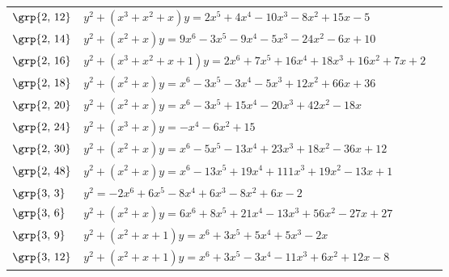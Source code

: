 \begin{longtable}{@{}>{\raggedright\arraybackslash}p{1.35cm}
 >{\raggedright\arraybackslash}p{}
 >{\raggedright\arraybackslash}p{1.25cm}@{}}
$\grp{2,\,12}$ & \href{https://www.lmfdb.org/Genus2Curve/Q/450/a/36450/1}{$y^2 + (x^{3}+x^{2}+x)y = 2x^{5}+4x^{4}-10x^{3}-8x^{2}+15x-5$} & \cite{HLP2000}\\
$\grp{2,\,14}$ & \href{https://alpha.lmfdb.org/Genus2Curve/Q/?jump=[[10,-6,-24,-5,-9,-3,9],[0,1,1]]}{$y^2 + (x^{2}+x)y = 9x^{6}-3x^{5}-9x^{4}-5x^{3}-24x^{2}-6x+10$} & \cite{BookerSutherland}\\
$\grp{2,\,16}$ & \href{https://alpha.lmfdb.org/Genus2Curve/Q/?jump=[[2,7,16,18,16,7,2],[1,1,1,1]]}{$y^2 + (x^{3}+x^{2}+x+1)y = 2x^{6}+7x^{5}+16x^{4}+18x^{3}+16x^{2}+7x+2$} & \cite{BookerSutherland}\\
$\grp{2,\,18}$ & \href{https://alpha.lmfdb.org/Genus2Curve/Q/?jump=[[36,66,12,-5,-3,-3,1],[0,1,1]]}{$y^2 + (x^{2}+x)y = x^{6}-3x^{5}-3x^{4}-5x^{3}+12x^{2}+66x+36$} & \cite{BookerSutherland}\\
$\grp{2,\,20}$ & \href{https://alpha.lmfdb.org/Genus2Curve/Q/?jump=[[0,-18,42,-20,15,-3,1],[0,1,1]]}{$y^2 + (x^{2}+x)y = x^{6}-3x^{5}+15x^{4}-20x^{3}+42x^{2}-18x$} & \cite{BookerSutherland}\\
$\grp{2,\,24}$ & \href{https://alpha.lmfdb.org/Genus2Curve/Q/?jump=[[15,0,-6,0,-1],[0,1,0,1]]}{$y^2 + (x^{3}+x)y = -x^{4}-6x^{2}+15$} & \cite{HLP2000}\\
$\grp{2,\,30}$ & \href{https://alpha.lmfdb.org/Genus2Curve/Q/?jump=[[12,-36,18,23,-13,-5,1],[0,1,1]]}{$y^2 + (x^{2}+x)y = x^{6}-5x^{5}-13x^{4}+23x^{3}+18x^{2}-36x+12$} & \cite{BookerSutherland}\\
$\grp{2,\,48}$ & \href{https://alpha.lmfdb.org/Genus2Curve/Q/?jump=[[1,-13,19,111,19,-13,1],[0,1,1]]}{$y^2 + (x^{2}+x)y = x^{6}-13x^{5}+19x^{4}+111x^{3}+19x^{2}-13x+1$} & \cite{BookerSutherland}\\
$\grp{3,\,3}$ & \href{https://alpha.lmfdb.org/Genus2Curve/Q/?jump=[[-2,6,-8,6,-8,6,-2],[0]]}{$y^2 = -2x^{6}+6x^{5}-8x^{4}+6x^{3}-8x^{2}+6x-2$} & \cite{BSSVY}\\
$\grp{3,\,6}$ & \href{https://alpha.lmfdb.org/Genus2Curve/Q/?jump=[[27,-27,56,-13,21,8,6],[0,1,1]]}{$y^2 + (x^{2}+x)y = 6x^{6}+8x^{5}+21x^{4}-13x^{3}+56x^{2}-27x+27$} & \cite{BSSVY}\\
$\grp{3,\,9}$ & \href{https://alpha.lmfdb.org/Genus2Curve/Q/?jump=[[0,-2,0,5,5,3,1],[1,1,1]]}{$y^2 + (x^{2}+x+1)y = x^{6}+3x^{5}+5x^{4}+5x^{3}-2x$} & \cite{HLP2000}\\
$\grp{3,\,12}$ & \href{https://alpha.lmfdb.org/Genus2Curve/Q/?jump=[[-8,12,6,-11,-3,3,1],[1,1,1]]}{$y^2 + (x^{2}+x+1)y = x^{6}+3x^{5}-3x^{4}-11x^{3}+6x^{2}+12x-8$} & \cite{HLP2000}\\

\end{longtable}
